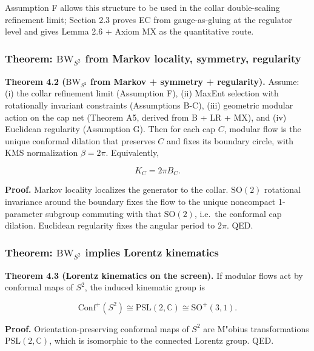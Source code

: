 \documentclass[11pt,a4paper]{article}
\theoremstyle{remark}
\begin{document}
Assumption F allows this structure to be used in the collar double-scaling
refinement limit; Section 2.3 proves EC from gauge-as-gluing at the regulator
level and gives Lemma 2.6 + Axiom MX as the quantitative route.

\subsubsection{\texorpdfstring{Theorem: \(\mathrm{BW}_{S^2}\) from Markov locality, symmetry, regularity}{Theorem: \textbackslash mathrm\{BW\}\_\{S\^{}2\} from Markov locality, symmetry, regularity}}\label{theorem-mathrmbw_s2-from-markov-locality-symmetry-regularity}

\textbf{Theorem 4.2 (\(\mathrm{BW}_{S^2}\) from Markov + symmetry + regularity).} Assume: (i)
the collar refinement limit (Assumption F), (ii) MaxEnt selection with
rotationally invariant constraints (Assumptions B-C), (iii) geometric modular
action on the cap net (Theorem A5, derived from B + LR + MX), and (iv) Euclidean
regularity (Assumption G). Then for each cap \(C\), modular flow is the unique
conformal dilation that preserves \(C\) and fixes its boundary circle, with KMS
normalization \(\beta = 2\pi\). Equivalently,

\[
K_C = 2 \pi B_C.
\]

\textbf{Proof.} Markov locality localizes the generator to the collar. \(\mathrm{SO}(2)\)
rotational invariance around the boundary fixes the flow to the unique
noncompact 1-parameter subgroup commuting with that \(\mathrm{SO}(2)\), i.e.~the
conformal cap dilation. Euclidean regularity fixes the angular period to
\(2\pi\). QED.

\subsubsection{\texorpdfstring{Theorem: \(\mathrm{BW}_{S^2}\) implies Lorentz kinematics}{Theorem: \textbackslash mathrm\{BW\}\_\{S\^{}2\} implies Lorentz kinematics}}\label{theorem-mathrmbw_s2-implies-lorentz-kinematics}

\textbf{Theorem 4.3 (Lorentz kinematics on the screen).} If modular flows act by
conformal maps of \(S^2\), the induced kinematic group is

\[
\mathrm{Conf}^+(S^2) \cong \mathrm{PSL}(2,\mathbb C) \cong \mathrm{SO}^+(3,1).
\]

\textbf{Proof.} Orientation-preserving conformal maps of \(S^2\) are M"obius
transformations \(\mathrm{PSL}(2,\mathbb{C})\), which is isomorphic to the connected Lorentz
group. QED.
\end{document}
